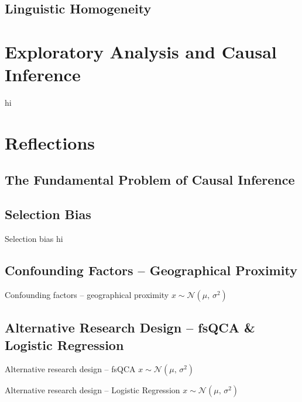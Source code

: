 \documentclass{beamer}
\begin{document}
	\subsection{Linguistic Homogeneity}
	\section{Exploratory Analysis and Causal Inference}
	\begin{frame}{}
		hi
	\end{frame}
	\section{Reflections}
	\subsection{The Fundamental Problem of Causal Inference}
	\subsection{Selection Bias}
	\begin{frame}{Selection bias}
		hi
	\end{frame}
	\subsection{Confounding Factors -- Geographical Proximity}
	\begin{frame}{Confounding factors -- geographical proximity}
		$x \sim \mathcal{N}(\mu,\,\sigma^{2})$
	\end{frame}
	\subsection{Alternative Research Design -- fsQCA \& Logistic Regression}
	\begin{frame}{Alternative research design -- fsQCA}
		$x \sim \mathcal{N}(\mu,\,\sigma^{2})$
	\end{frame}
	\begin{frame}{Alternative research design -- Logistic Regression}
		$x \sim \mathcal{N}(\mu,\,\sigma^{2})$
	\end{frame}
\end{document}
